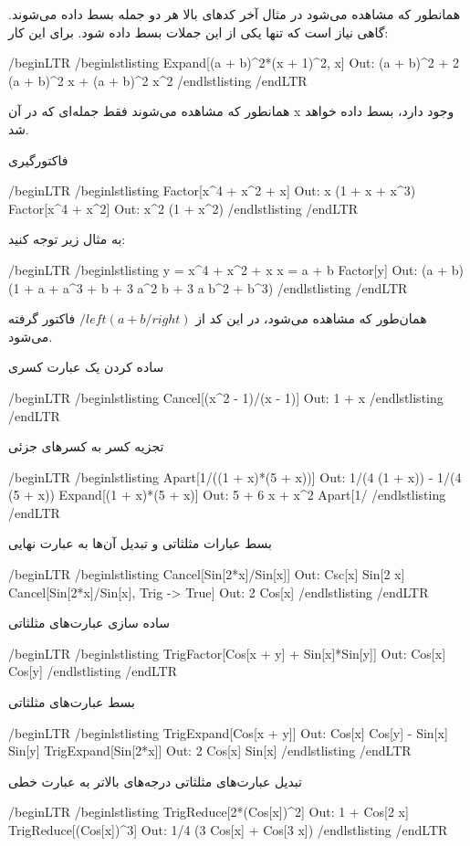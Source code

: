 همانطور که مشاهده می‌شود در مثال آخر کدهای بالا هر دو جمله بسط داده می‌شوند. گاهی نیاز است که تنها یکی از این جملات بسط داده شود. برای این کار:

/begin{LTR}
/begin{lstlisting}
Expand[(a + b)^2*(x + 1)^2, x]       Out: (a + b)^2 + 2 (a + b)^2 x + (a + b)^2 x^2
/end{lstlisting}
/end{LTR}

همانطور که مشاهده می‌شوند فقط جمله‌ای که در آن x وجود دارد، بسط داده خواهد شد.

فاکتورگیری

/begin{LTR}
/begin{lstlisting}
Factor[x^4 + x^2 + x]     Out: x (1 + x + x^3)
Factor[x^4 + x^2]         Out: x^2 (1 + x^2)
/end{lstlisting}
/end{LTR}

به مثال زیر توجه کنید:

/begin{LTR}
/begin{lstlisting}
y = x^4 + x^2 + x
x = a + b
Factor[y]      Out: (a + b) (1 + a + a^3 + b + 3 a^2 b + 3 a b^2 + b^3)
/end{lstlisting}
/end{LTR}

همان‌طور که مشاهده می‌شود، در این کد از $/left(a+b/right)$ فاکتور گرفته می‌شود.


ساده کردن یک عبارت کسری

/begin{LTR}
/begin{lstlisting}
Cancel[(x^2 - 1)/(x - 1)]     Out: 1 + x
/end{lstlisting}
/end{LTR}

تجزیه کسر به کسرهای جزئی

/begin{LTR}
/begin{lstlisting}
Apart[1/((1 + x)*(5 + x))]    Out: 1/(4 (1 + x)) - 1/(4 (5 + x))
Expand[(1 + x)*(5 + x)]       Out: 5 + 6 x + x^2
Apart[1/%
/end{lstlisting}
/end{LTR}

بسط عبارات مثلثاتی و تبدیل آن‌ها به عبارت نهایی

/begin{LTR}
/begin{lstlisting}
Cancel[Sin[2*x]/Sin[x]]                     Out: Csc[x] Sin[2 x]
Cancel[Sin[2*x]/Sin[x], Trig  -> True]      Out: 2 Cos[x]
/end{lstlisting}
/end{LTR}

ساده سازی عبارت‌های مثلثاتی

/begin{LTR}
/begin{lstlisting}
TrigFactor[Cos[x + y] + Sin[x]*Sin[y]]               Out: Cos[x] Cos[y]
/end{lstlisting}
/end{LTR}

بسط عبارت‌های مثلثاتی

/begin{LTR}
/begin{lstlisting}
TrigExpand[Cos[x + y]]             Out: Cos[x] Cos[y] - Sin[x] Sin[y]
TrigExpand[Sin[2*x]]               Out: 2 Cos[x] Sin[x]
/end{lstlisting}
/end{LTR}

تبدیل عبارت‌های مثلثاتی درجه‌های بالاتر به عبارت خطی

/begin{LTR}
/begin{lstlisting}
TrigReduce[2*(Cos[x])^2]           Out: 1 + Cos[2 x]
TrigReduce[(Cos[x])^3]             Out: 1/4 (3 Cos[x] + Cos[3 x])
/end{lstlisting}
/end{LTR}

